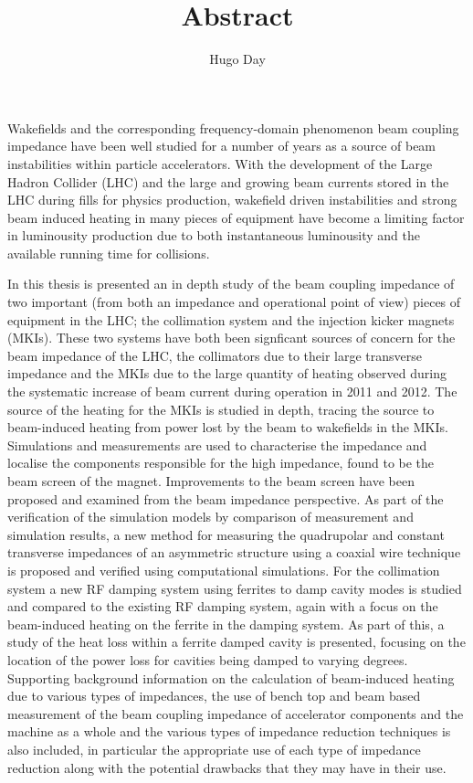 \documentclass[12pt]{article} %
\title{Abstract}
\author{Hugo Day}
\begin{document}
\maketitle



Wakefields and the corresponding frequency-domain phenomenon beam coupling impedance have been well studied for a number of years as a source of beam instabilities within particle accelerators. With the development of the Large Hadron Collider (LHC) and the large and growing beam currents stored in the LHC during fills for physics production, wakefield driven instabilities and strong beam induced heating in many pieces of equipment have become a limiting factor in luminousity production due to both instantaneous luminousity and the available running time for collisions.

In this thesis is presented an in depth study of the beam coupling impedance of two important (from both an impedance and operational point of view) pieces of equipment in the LHC; the collimation system and the injection kicker magnets (MKIs). These two systems have both been signficant sources of concern for the beam impedance of the LHC, the collimators due to their large transverse impedance and the MKIs due to the large quantity of heating observed during the systematic increase of beam current during operation in 2011 and 2012. The source of the heating for the MKIs is studied in depth, tracing the source to beam-induced heating from power lost by the beam to wakefields in the MKIs. Simulations and measurements are used to characterise the impedance and localise the components responsible for the high impedance, found to be the beam screen of the magnet. Improvements to the beam screen have been proposed and examined from the beam impedance perspective. As part of the verification of the simulation models by comparison of measurement and simulation results, a new method for measuring the quadrupolar and constant transverse impedances of an asymmetric structure using a coaxial wire technique is proposed and verified using computational simulations. For the collimation system a new RF damping system using ferrites to damp cavity modes is studied and compared to the existing RF damping system, again with a focus on the beam-induced heating on the ferrite in the damping system. As part of this, a study of the heat loss within a ferrite damped cavity is presented, focusing on the location of the power loss for cavities being damped to varying degrees. Supporting background information on the calculation of beam-induced heating due to various types of impedances, the use of bench top and beam based measurement of the beam coupling impedance of accelerator components and the machine as a whole and the various types of impedance reduction techniques is also included, in particular the appropriate use of each type of impedance reduction along with the potential drawbacks that they may have in their use.
\end{document}
